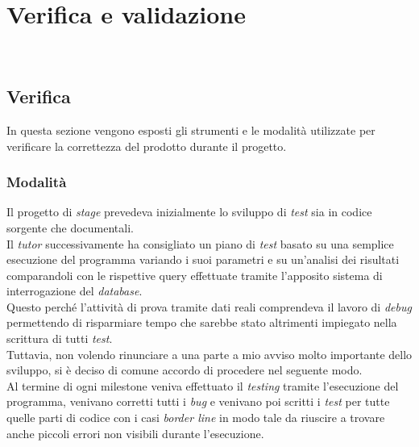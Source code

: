 
\chapter{Verifica e validazione}
\label{cap:verifica-validazione}

\noindent {}\\

\section{Verifica}
\noindent In questa sezione vengono esposti gli strumenti e le modalità utilizzate
per verificare la correttezza del prodotto durante il progetto.

\subsection{Modalità}
\noindent Il progetto di \textit{stage} prevedeva inizialmente lo sviluppo di \textit{test} sia in codice
sorgente che documentali.\\

\noindent Il \textit{tutor} successivamente ha consigliato un piano di \textit{test} basato su una semplice
esecuzione del programma variando i suoi parametri e su un'analisi
dei risultati comparandoli con le rispettive query effettuate tramite
l'apposito sistema di interrogazione del \textit{database}.\\
Questo perché l’attività di prova tramite dati reali comprendeva il lavoro
di \textit{debug} permettendo di risparmiare tempo che sarebbe stato altrimenti
impiegato nella scrittura di tutti \textit{test}.\\

\noindent Tuttavia, non volendo rinunciare a una parte a mio avviso molto importante dello
sviluppo, si è deciso di comune accordo di procedere nel seguente modo.\\
Al termine di ogni milestone veniva effettuato il \textit{testing} tramite l'esecuzione del
programma, venivano corretti tutti i \textit{bug} e venivano poi scritti i \textit{test} per tutte
quelle parti di codice con i casi \textit{border line} in modo tale da riuscire a trovare anche
piccoli errori non visibili durante l'esecuzione.\\

